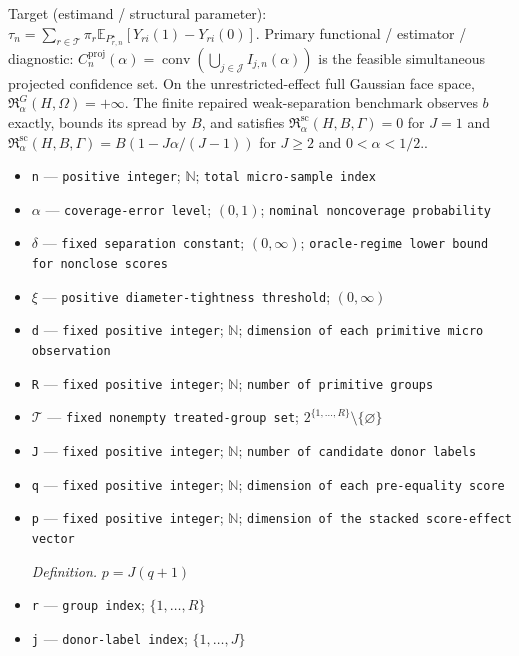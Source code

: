 \documentclass{article}
\begin{document}
Target (estimand / structural parameter): \(\tau_n=\sum_{r\in\mathcal T}\pi_r\mathbb E_{P_{r,n}^{\star}}[Y_{ri}(1)-Y_{ri}(0)]\).
Primary functional / estimator / diagnostic: \(C_n^{\mathrm{proj}}(\alpha)=\operatorname{conv}(\bigcup_{j\in\mathcal J}I_{j,n}(\alpha))\) is the feasible simultaneous projected confidence set. On the unrestricted-effect full Gaussian face space, \(\mathfrak R_{\alpha}^{G}(H,\Omega)=+\infty\). The finite repaired weak-separation benchmark observes \(b\) exactly, bounds its spread by \(B\), and satisfies \(\mathfrak R_{\alpha}^{\mathrm{sc}}(H,B,\Gamma)=0\) for \(J=1\) and \(\mathfrak R_{\alpha}^{\mathrm{sc}}(H,B,\Gamma)=B(1-J\alpha/(J-1))\) for \(J\geq2\) and \(0<\alpha<1/2\)..
\begin{itemize}
  \item \texttt{n} --- \texttt{positive integer}; \(\mathbb N\); \texttt{total micro-\allowbreak{}sample index}
  \item \(\alpha\) --- \texttt{coverage-\allowbreak{}error level}; \((0,1)\); \texttt{nominal noncoverage probability}
  \item \(\delta\) --- \texttt{fixed separation constant}; \((0,\infty)\); \texttt{oracle-\allowbreak{}regime lower bound for nonclose scores}
  \item \(\xi\) --- \texttt{positive diameter-\allowbreak{}tightness threshold}; \((0,\infty)\)
  \item \texttt{d} --- \texttt{fixed positive integer}; \(\mathbb N\); \texttt{dimension of each primitive micro observation}
  \item \texttt{R} --- \texttt{fixed positive integer}; \(\mathbb N\); \texttt{number of primitive groups}
  \item \(\mathcal T\) --- \texttt{fixed nonempty treated-\allowbreak{}group set}; \(2^{\{1,\ldots,R\}}\setminus\{\varnothing\}\)
  \item \texttt{J} --- \texttt{fixed positive integer}; \(\mathbb N\); \texttt{number of candidate donor labels}
  \item \texttt{q} --- \texttt{fixed positive integer}; \(\mathbb N\); \texttt{dimension of each pre-\allowbreak{}equality score}
  \item \texttt{p} --- \texttt{fixed positive integer}; \(\mathbb N\); \texttt{dimension of the stacked score-\allowbreak{}effect vector}
  \par\smallskip\noindent\emph{Definition.} \(p=J(q+1)\)
  \item \texttt{r} --- \texttt{group index}; \(\{1,\ldots,R\}\)
  \item \texttt{j} --- \texttt{donor-\allowbreak{}label index}; \(\{1,\ldots,J\}\)

\end{itemize}
\end{document}
